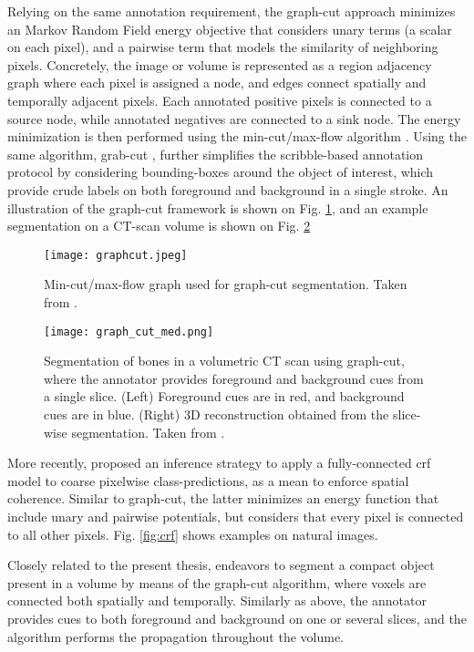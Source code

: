 Relying on the same annotation requirement, the graph-cut approach \cite{boykov2006}
minimizes an Markov Random Field energy objective that considers unary terms (a scalar on each pixel), and a pairwise term that models the similarity of neighboring pixels.
Concretely, the image or volume is represented as a region adjacency graph where each pixel is assigned a node, and edges connect spatially and temporally adjacent pixels.
Each annotated positive pixels is connected to a source node, while annotated negatives are connected to a sink node.
The energy minimization is then performed using the min-cut/max-flow algorithm \cite{goldberg88}.
Using the same algorithm, grab-cut \cite{rother04}, further simplifies the scribble-based annotation protocol by considering bounding-boxes around the object of interest, which provide crude labels on both foreground and background in a single stroke.
An illustration of the graph-cut framework is shown on Fig. \ref{fig:graphcut}, and an example
segmentation on a CT-scan volume is shown on Fig. \ref{fig:graphcut_medical}

\begin{figure}[!h]
  \centering
  \texttt{[image: graphcut.jpeg]}
  \caption{Min-cut/max-flow graph used for graph-cut segmentation. Taken from \cite{xiao17}.}
  \label{fig:graphcut}
\end{figure}

\begin{figure}[!h]
  \centering
  \texttt{[image: graph\_cut\_med.png]}
  \caption{Segmentation of bones in a volumetric CT scan using graph-cut, where the annotator provides
    foreground and background cues from a single slice. (Left) Foreground cues are in red, and
    background cues are in blue. (Right) 3D reconstruction obtained from the slice-wise segmentation.
    Taken from \cite{boykov2006}.}
  \label{fig:graphcut_medical}
\end{figure}

More recently, \cite{krahenbuhl11} proposed an inference strategy to apply a fully-connected \gls{crf} model to coarse pixelwise class-predictions, as a mean to enforce spatial coherence.
Similar to graph-cut, the latter minimizes an energy function that include unary and pairwise potentials, but considers that every pixel is connected to all other pixels.
Fig. \ref{fig:crf} shows examples on natural images.

Closely related to the present thesis, \cite{campbell10, jirik18} endeavors to segment a compact object
present in a volume by means of the graph-cut algorithm, where voxels are connected both spatially and temporally.
Similarly as above, the annotator provides cues to both foreground and background on one or several slices,
and the algorithm performs the propagation throughout the volume.


